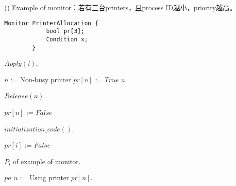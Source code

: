 \begin{theorem}{()} Example of monitor：若有三台printers，且process ID越小，priority越高。
    \begin{lstlisting}[caption={Data structure of example of monitor}, captionpos=b, mathescape=true]
        Monitor PrinterAllocation {
            bool pr[3];
            Condition x;
        } 
    \end{lstlisting}
    \begin{algorithm}[H]
        \caption{$Apply(i)$.}
        \begin{algorithmic}[1]
                    \State {}
                \Else
                    \State $n$ := Non-busy printer
                    \State $pr[n]$ := $True$
                    \State \Return $n$
                \EndIf
            \EndFunction
        \end{algorithmic}
    \end{algorithm}
    \begin{algorithm}[H]
        \caption{$Release(n)$.}
        \begin{algorithmic}[1]
                \State $pr[n]$ := $False$
                \State {}
            \EndFunction
        \end{algorithmic}
    \end{algorithm}
    \begin{algorithm}[H]
        \caption{$initialization\_code()$.}
        \begin{algorithmic}[1]
                    \State $pr[i]$ := $False$
                \EndFor
            \EndFunction
        \end{algorithmic}
    \end{algorithm}
    \begin{algorithm}[H]
        \caption{$P_i$ of example of monitor.}
        \begin{algorithmic}[1]
                \State {} $pa$ 
                \State $n$ := 
                \State Using printer $pr[n]$.
                \State {}
            \EndFunction
        \end{algorithmic}
    \end{algorithm}
\end{theorem}

